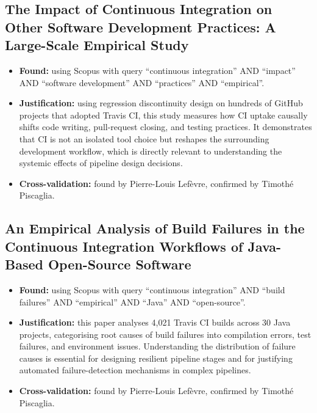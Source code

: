 \documentclass[a4paper,11pt,oneside]{article}
\begin{document}
\subsection{The Impact of Continuous Integration on Other Software Development Practices: A Large-Scale Empirical Study \cite{Zhao2017}}
%
\begin{itemize}
    \item \textbf{Found:} using Scopus with query ``continuous integration'' AND ``impact'' AND ``software development'' AND ``practices'' AND ``empirical''.
    \item \textbf{Justification:} using regression discontinuity design on hundreds of GitHub projects that adopted Travis CI, this study measures how CI uptake causally shifts code writing, pull-request closing, and testing practices. It demonstrates that CI is not an isolated tool choice but reshapes the surrounding development workflow, which is directly relevant to understanding the systemic effects of pipeline design decisions.
    \item \textbf{Cross-validation:} found by Pierre-Louis Lef\`{e}vre, confirmed by Timoth\'{e} Piscaglia.
\end{itemize}

\subsection{An Empirical Analysis of Build Failures in the Continuous Integration Workflows of Java-Based Open-Source Software \cite{Rausch2017}}
%
\begin{itemize}
    \item \textbf{Found:} using Scopus with query ``continuous integration'' AND ``build failures'' AND ``empirical'' AND ``Java'' AND ``open-source''.
    \item \textbf{Justification:} this paper analyses 4,021 Travis CI builds across 30 Java projects, categorising root causes of build failures into compilation errors, test failures, and environment issues. Understanding the distribution of failure causes is essential for designing resilient pipeline stages and for justifying automated failure-detection mechanisms in complex pipelines.
    \item \textbf{Cross-validation:} found by Pierre-Louis Lef\`{e}vre, confirmed by Timoth\'{e} Piscaglia.
\end{itemize}

\end{document}
